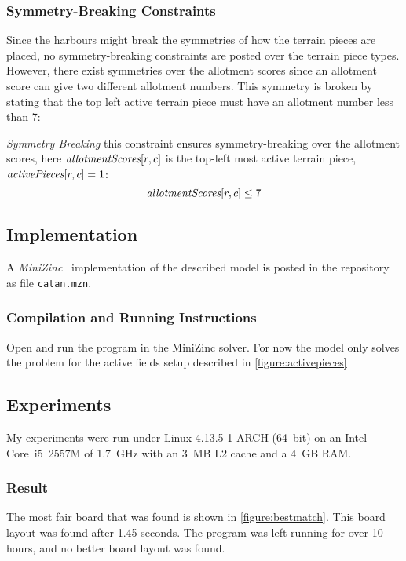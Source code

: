 \documentclass[a4paper,11pt]{article}
\begin{document}
\subsubsection{Symmetry-Breaking Constraints}
Since the harbours might break the symmetries of how the terrain pieces are placed, no symmetry-breaking constraints are posted over the terrain piece types. However, there exist symmetries over the allotment scores since an allotment score can give two different allotment numbers. This symmetry is broken by stating that the top left active terrain piece must have an allotment number less than 7:

\emph{Symmetry Breaking} this constraint ensures symmetry-breaking over the allotment scores, here $\textit{allotmentScores}[r,c]$ is the top-left most active terrain piece, $\textit{activePieces}[r,c]=1$:
  \begin{equation} \label{cons:hint}
	\textit{allotmentScores}[r,c] \leq 7
  \end{equation}

\subsection{Implementation}

A \textit{MiniZinc}~\cite{minizinc} implementation of the described model is posted in the repository as file \texttt{catan.mzn}.

\subsubsection{Compilation and Running Instructions}
Open and run the program in the MiniZinc solver. For now the model only solves the problem for the active fields setup described in \ref{figure:activepieces}

\subsection{Experiments}

My experiments were run under Linux 4.13.5-1-ARCH (64~bit) on an
Intel Core~i5~2557M of 1.7~GHz with an 3~MB L2 cache and a 4~GB RAM.

\subsubsection{Result}
The most fair board that was found is shown in \ref{figure:bestmatch}. This board layout was found after 1.45 seconds. The program was left running for over 10 hours, and no better board layout was found.




\end{document}
